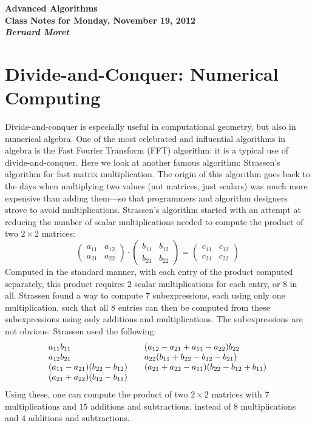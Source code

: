\documentclass[11pt]{article}
\begin{document}
\begin{center}
  \LARGE\bf Advanced Algorithms\\

  \Large\sf
  Class Notes for Monday, November 19, 2012\\

  \it
  Bernard Moret
\end{center}

\bigskip

\section{Divide-and-Conquer: Numerical Computing}
Divide-and-conquer is especially useful in computational geometry, but
also in numerical algebra.  One of the most celebrated and influential
algorithms in algebra is the Fast Fourier Transform (FFT) algorithm:
it is a typical use of divide-and-conquer.  Here we look at another
famous algorithm: Strassen's algorithm for fast matrix multiplication.
The origin of this algorithm goes back to the days when multiplying
two values (not matrices, just scalars) was much more expensive than
adding them---so that programmers and algorithm designers strove
to avoid multiplications.   Strassen's algorithm started with
an attempt at reducing the number of scalar multiplications needed to
compute the product of two $2\times 2$ matrices:
  $$\left(\begin{array}{cc}
	    a_{11} & a_{12}\\
	    a_{21} & a_{22}
          \end{array}\right)
    \cdot
    \left(\begin{array}{cc}
	    b_{11} & b_{12}\\
	    b_{21} & b_{22}
          \end{array}\right)
    =
    \left(\begin{array}{cc}
	    c_{11} & c_{12}\\
	    c_{21} & c_{22}
          \end{array}\right)
  $$
Computed in the standard manner, with each entry of the product
computed separately, this product requires $2$ scalar multiplications
for each entry, or $8$ in all.  Strassen found a way to compute
$7$ subexpressions, each using only one multiplication, such that all
$8$ entries can then be computed from these subexpressions using only
additions and multiplications.  The subexpressions are not obvious:
Strassen used the following:
  $$\begin{array}{l@{\qquad}l}
      a_{11}b_{11} & (a_{12}-a_{21}+a_{11}-a_{22})b_{22} \\
      a_{12}b_{21} & a_{22}(b_{11}+b_{22}-b_{12}-b_{21}) \\
      (a_{11}-a_{21})(b_{22}-b_{12}) & (a_{21}+a_{22}-a_{11})(b_{22}-b_{12}+b_{1
1}) \\
      (a_{21}+a_{22})(b_{12}-b_{11}) &
    \end{array}$$
Using these, one can compute the product of two $2\times 2$ matrices with
$7$ multiplications and $15$ additions and subtractions, instead of
$8$ multiplications and $4$ additions and subtractions.
\end{document}
